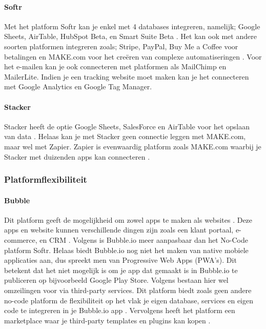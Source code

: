 \paragraph{Softr}
Met het platform Softr kan je enkel met 4 databases integreren, namelijk; Google Sheets, AirTable, HubSpot Beta, en Smart Suite Beta \autocite{Frater2024}. 
Het kan ook met andere soorten platformen integreren zoals; Stripe, PayPal, Buy Me a Coffee voor betalingen en MAKE.com voor het creëren van complexe automatiseringen \autocite{Code2023} \autocite{Youssef2023}. 
Voor het e-mailen kan je ook connecteren met platformen als MailChimp en MailerLite. Indien je een tracking website moet maken kan je het connecteren met Google Analytics en Google Tag Manager.
\paragraph{Stacker}
Stacker heeft de optie Google Sheets, SalesForce en AirTable voor het opslaan van data \autocite{Englert2021} \autocite{JDN2023} \autocite{Youssef2023}. 
Helaas kan je met Stacker geen connectie leggen met MAKE.com, maar wel met Zapier. 
Zapier is evenwaardig platform zoals MAKE.com waarbij je Stacker met duizenden apps kan connecteren \autocite{Zapier}.
\subsubsection*{Platformflexibiliteit}

\paragraph{Bubble}
Dit platform geeft de mogelijkheid om zowel apps te maken als websites \autocite{Youssef2023}. 
Deze apps en website kunnen verschillende dingen zijn zoals een klant portaal, e-commerce, en CRM \autocite{Sharma2022}. 
Volgens \textcite{Youssef2023} is Bubble.io meer aanpasbaar dan het No-Code platform Softr. Helaas biedt Bubble.io nog niet het maken van native mobiele applicaties aan, dus spreekt men van Progressive Web Apps (PWA’s). 
Dit betekent dat het niet mogelijk is om je app dat gemaakt is in Bubble.io te publiceren op bijvoorbeeld Google Play Store. Volgens \textcite{Sharma2022} bestaan hier wel omzeilingen voor via third-party services. Dit platform biedt zoals geen andere no-code platform de flexibiliteit op het vlak je eigen database, services en eigen code te integreren in je Bubble.io app \autocite{Bas2024}. 
Vervolgens heeft het platform een marketplace waar je third-party templates en plugins kan kopen \autocite{Sharma2022}. 
